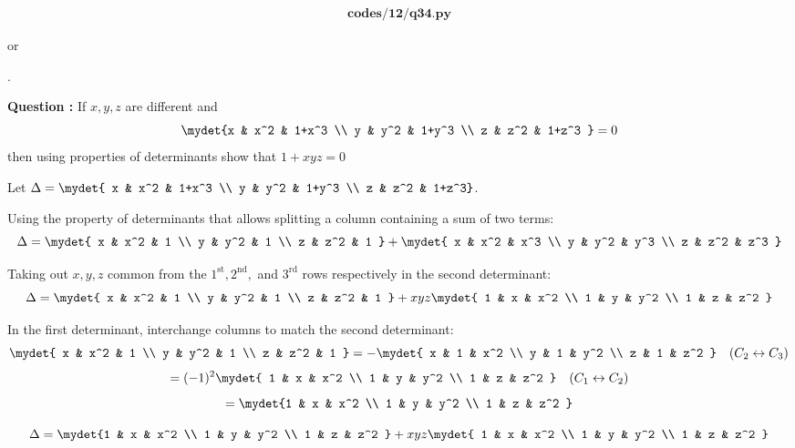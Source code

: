 \begin{enumerate}[label=\thesubsection.\arabic*, ref=\thesubsection.\theenumi]
\begin{align}
	\textbf{codes/12/q34.py}
\end{align}
\begin{center}
    or 
\end{center}.


\textbf{Question :} If $x, y, z$ are different and 
$$\mydet {x & x^2 & 1+x^3 \\ y & y^2 & 1+y^3 \\ z & z^2 & 1+z^3 } = 0$$
then using properties of determinants show that $1+xyz=0$

\solution

Let $\Delta = \mydet{ x & x^2 & 1+x^3 \\ y & y^2 & 1+y^3 \\ z & z^2 & 1+z^3}$.

Using the property of determinants that allows splitting a column containing a sum of two terms:
$$\Delta = \mydet{ x & x^2 & 1 \\ y & y^2 & 1 \\ z & z^2 & 1 } + \mydet{ x & x^2 & x^3 \\ y & y^2 & y^3 \\ z & z^2 & z^3 }$$

Taking out $x, y, z$ common from the $1^{\text{st}}, 2^{\text{nd}},$ and $3^{\text{rd}}$ rows respectively in the second determinant:
$$\Delta = \mydet{ x & x^2 & 1 \\ y & y^2 & 1 \\ z & z^2 & 1 } + xyz \mydet{ 1 & x & x^2 \\ 1 & y & y^2 \\ 1 & z & z^2 }$$

In the first determinant, interchange columns to match the second determinant:
$$
\mydet{ x & x^2 & 1 \\ y & y^2 & 1 \\ z & z^2 & 1 } = -\mydet{ x & 1 & x^2 \\ y & 1 & y^2 \\ z & 1 & z^2 } \quad (C_2 \leftrightarrow C_3) \\$$
$$= (-1)^2 \mydet{ 1 & x & x^2 \\ 1 & y & y^2 \\ 1 & z & z^2 } \quad (C_1 \leftrightarrow C_2) \\$$
$$=\mydet{1 & x & x^2 \\ 1 & y & y^2 \\ 1 & z & z^2 }$$

$$\Delta = \mydet{1 & x & x^2 \\ 1 & y & y^2 \\ 1 & z & z^2 } + xyz \mydet{ 1 & x & x^2 \\ 1 & y & y^2 \\ 1 & z & z^2 }$$


\end{enumerate}
